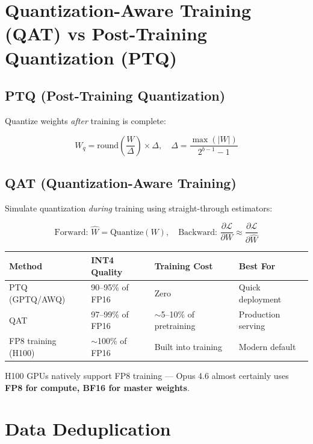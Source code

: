 \documentclass[11pt,a4paper]{article}
\begin{document}
\section{Quantization-Aware Training (QAT) vs Post-Training Quantization (PTQ)}

\subsection{PTQ (Post-Training Quantization)}

Quantize weights \textit{after} training is complete:

$$W_q = \text{round}\!\left(\frac{W}{\Delta}\right) \times \Delta, \quad \Delta = \frac{\max(|W|)}{2^{b-1} - 1}$$

\subsection{QAT (Quantization-Aware Training)}

Simulate quantization \textit{during} training using straight-through estimators:

$$\text{Forward: } \hat{W} = \text{Quantize}(W), \quad \text{Backward: } \frac{\partial \mathcal{L}}{\partial W} \approx \frac{\partial \mathcal{L}}{\partial \hat{W}}$$

\begin{center}
\begin{tabular}{llll}
\toprule
\textbf{Method} & \textbf{INT4 Quality} & \textbf{Training Cost} & \textbf{Best For} \\
\midrule
PTQ (GPTQ/AWQ) & 90--95\% of FP16 & Zero & Quick deployment \\
QAT & 97--99\% of FP16 & $\sim$5--10\% of pretraining & Production serving \\
FP8 training (H100) & $\sim$100\% of FP16 & Built into training & Modern default \\
\bottomrule
\end{tabular}
\end{center}

H100 GPUs natively support FP8 training --- Opus 4.6 almost certainly uses \textbf{FP8 for compute, BF16 for master weights}.

\section{Data Deduplication}
\end{document}
